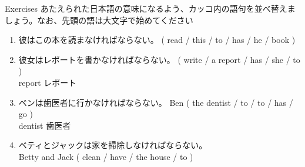 \documentclass[aspectratio=169,xcolor={dvipsnames,table}]{beamer}
\newcommand{\myaudio}[1]{\href{#1}{\faVolumeUp}}
\begin{document}
\begin{frame}[plain]{Exercises}
あたえられた日本語の意味になるよう、カッコ内の語句を並べ替えましょう。なお、先頭の語は大文字で始めてください%
\hfill{\scriptsize \myaudio{./audio/014_have_to_04.mp3}}
 \begin{enumerate}
  \item {\small 彼はこの本を読まなければならない。}
( read / this / to / has / he / book )\\
  \item {\small 彼女はレポートを書かなければならない。}
( write / a report / has / she / to )\\
\hfill{}{\scriptsize report  レポート}
  \item {\small ベンは歯医者に行かなければならない。}
Ben ( the dentist / to / to / has / go )\\
\hfill{}{\scriptsize dentist  歯医者}  
\item {\small ベティとジャックは家を掃除しなければならない。}\\
Betty and Jack  ( clean /  have / the house / to )\\
 \end{enumerate}
\end{frame}
\end{document}
